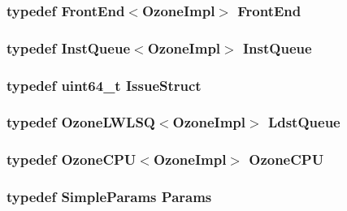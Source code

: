 \label{structOzoneImpl_a97c1adaf6da40f1dd1f86fe0b3b51249}
\hypertarget{structOzoneImpl_a1f77546932fd687bb136bd55beaf657e}{
\subsubsection[{FrontEnd}]{\setlength{\rightskip}{0pt plus 5cm}typedef {\bf FrontEnd}$<${\bf OzoneImpl}$>$ {\bf FrontEnd}}}
\label{structOzoneImpl_a1f77546932fd687bb136bd55beaf657e}
\hypertarget{structOzoneImpl_a9c97500b4447f101c7d7996cd7324278}{
\subsubsection[{InstQueue}]{\setlength{\rightskip}{0pt plus 5cm}typedef {\bf InstQueue}$<${\bf OzoneImpl}$>$ {\bf InstQueue}}}
\label{structOzoneImpl_a9c97500b4447f101c7d7996cd7324278}
\hypertarget{structOzoneImpl_ad906a02b6e2b621a30df354fa780da6f}{
\subsubsection[{IssueStruct}]{\setlength{\rightskip}{0pt plus 5cm}typedef uint64\_\-t {\bf IssueStruct}}}
\label{structOzoneImpl_ad906a02b6e2b621a30df354fa780da6f}
\hypertarget{structOzoneImpl_a5e9f2d9dd0e2c38d642664340beec7be}{
\subsubsection[{LdstQueue}]{\setlength{\rightskip}{0pt plus 5cm}typedef {\bf OzoneLWLSQ}$<${\bf OzoneImpl}$>$ {\bf LdstQueue}}}
\label{structOzoneImpl_a5e9f2d9dd0e2c38d642664340beec7be}
\hypertarget{structOzoneImpl_a78611b242a447d62247029586d6a2e4b}{
\subsubsection[{OzoneCPU}]{\setlength{\rightskip}{0pt plus 5cm}typedef {\bf OzoneCPU}$<${\bf OzoneImpl}$>$ {\bf OzoneCPU}}}
\label{structOzoneImpl_a78611b242a447d62247029586d6a2e4b}
\hypertarget{structOzoneImpl_a97a13164dd1bc9c081a6c711e68e6160}{
\subsubsection[{Params}]{\setlength{\rightskip}{0pt plus 5cm}typedef {\bf SimpleParams} {\bf Params}}}
\label{structOzoneImpl_a97a13164dd1bc9c081a6c711e68e6160}


